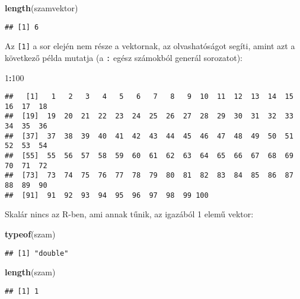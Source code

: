 \documentclass[]{book}
\newenvironment{Shaded}{\begin{snugshade}}{\end{snugshade}}
\newcommand{\DecValTok}[1]{\textcolor[rgb]{0.00,0.00,0.81}{#1}}
\newcommand{\KeywordTok}[1]{\textcolor[rgb]{0.13,0.29,0.53}{\textbf{#1}}}
\newcommand{\NormalTok}[1]{#1}
\newcommand{\OperatorTok}[1]{\textcolor[rgb]{0.81,0.36,0.00}{\textbf{#1}}}
\begin{document}
\begin{Shaded}
\begin{Highlighting}[]
\KeywordTok{length}\NormalTok{(szamvektor)}
\end{Highlighting}
\end{Shaded}

\begin{verbatim}
## [1] 6
\end{verbatim}

Az \texttt{{[}1{]}} a sor elején nem része a vektornak, az olvashatóságot segíti, amint azt a következő példa mutatja (a \texttt{:} egész számokból generál sorozatot):

\begin{Shaded}
\begin{Highlighting}[]
\DecValTok{1}\OperatorTok{:}\DecValTok{100}
\end{Highlighting}
\end{Shaded}

\begin{verbatim}
##   [1]   1   2   3   4   5   6   7   8   9  10  11  12  13  14  15  16  17  18
##  [19]  19  20  21  22  23  24  25  26  27  28  29  30  31  32  33  34  35  36
##  [37]  37  38  39  40  41  42  43  44  45  46  47  48  49  50  51  52  53  54
##  [55]  55  56  57  58  59  60  61  62  63  64  65  66  67  68  69  70  71  72
##  [73]  73  74  75  76  77  78  79  80  81  82  83  84  85  86  87  88  89  90
##  [91]  91  92  93  94  95  96  97  98  99 100
\end{verbatim}

Skalár nincs az R-ben, ami annak tűnik, az igazából 1 elemű vektor:

\begin{Shaded}
\begin{Highlighting}[]
\KeywordTok{typeof}\NormalTok{(szam)}
\end{Highlighting}
\end{Shaded}

\begin{verbatim}
## [1] "double"
\end{verbatim}

\begin{Shaded}
\begin{Highlighting}[]
\KeywordTok{length}\NormalTok{(szam)}
\end{Highlighting}
\end{Shaded}

\begin{verbatim}
## [1] 1
\end{verbatim}
\end{document}
